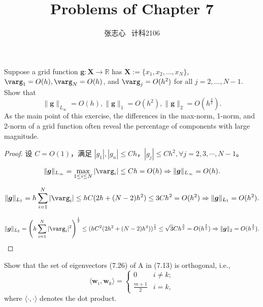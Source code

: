 \documentclass[lang=cn,a4paper,newtx,bibend=bibtex]{elegantpaper}
\title{Problems of Chapter 7}
\author{张志心 \ 计科2106}
\date{\zhdate{2023/12/28}}
\newcommand{\XB}{\bm{X}}
\newcommand{\gB}{\bm{g}}
\newcommand{\wB}{\bm{w}}
\newcommand{\RBB}{\mathbb{R}}
\newcommand{\indot}[2]{\langle {#1}, {#2} \rangle}
\begin{document}
\maketitle

\begin{prob}[Exercise 7.14]
  Suppose a grid function $\gB : \XB \to \RBB$ has $\XB:= \{x_1, x_2, \dots, x_N\}$,
  $\varg_1 = O(h), \varg_N = O(h)$, and $\varg_j = O(h^2)$ for all $j = 2, \dots, N - 1$. Show that
  \[\| \gB\|_{L_\infty} = O(h), \|\gB\|_1 = O(h^2), \|\gB\|_2 = O(h^{\frac32}).\]
  As the main point of this exercise, the differences in the max-norm, 1-norm, 
  and 2-norm of a grid function often reveal the percentage of components
  with large magnitude.
\end{prob}

\begin{proof}
设 $C = O(1)$，满足 $|g_1|, |g_n| \le Ch$，$|g_j| \le Ch^2, \forall j = 2, 3, \cdots, N-1$。

\[ \| \gB\|_{L_\infty} = \max_{1\le i \le N} |\varg_i| \le Ch = O(h) \Rightarrow \| \gB \|_{L_{\infty}} = O(h).\]

\[\|\gB\|_{L_1} = h \sum_{i = 1}^N |\varg_i| \le h C(2h + (N-2)h^2) \le 3Ch^2 = O(h^2) \Rightarrow \| \gB \|_{L_1} = O(h^2).\]

\[\|\gB\|_{L_2} = \left(h\sum_{i=1}^N|\varg_i|^2\right)^{\frac12} \le (hC^2(2h^2 + (N-2)h^4))^{\frac12} \le \sqrt{3}Ch^{\frac32} = O(h^{\frac32}) \Rightarrow \| \gB \|_2 = O(h^{\frac32}).\]

\end{proof}

\begin{prob}[Exercise 7.26]
  Show that the set of eigenvectors (7.26) of A in (7.13) is orthogonal, i.e.,
  \[\indot{\wB_i}{\wB_k} = \begin{cases} 0 & i \neq k; \\ \frac{m+1}2 & i = k,\end{cases}\]
  where $\indot{\cdot}{\cdot}$ denotes the dot product.
\end{prob}
\end{document}
